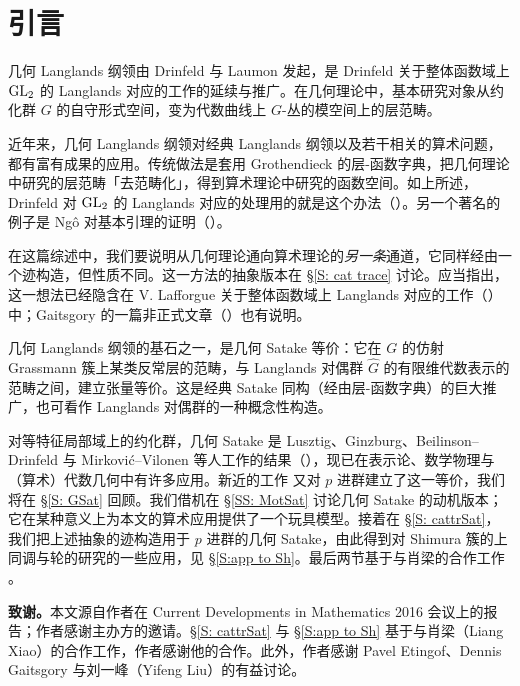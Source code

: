 
\section{引言}

几何 Langlands 纲领由 Drinfeld 与 Laumon 发起，是 Drinfeld 关于整体函数域上 ${\operatorname{GL}}_2$ 的 Langlands 对应的工作的延续与推广。在几何理论中，基本研究对象从约化群 $G$ 的自守形式空间，变为代数曲线上 $G$-丛的模空间上的层范畴。

近年来，几何 Langlands 纲领对经典 Langlands 纲领以及若干相关的算术问题，都有富有成果的应用。传统做法是套用 Grothendieck 的层-函数字典，把几何理论中研究的层范畴「去范畴化」，得到算术理论中研究的函数空间。如上所述，Drinfeld 对 ${\operatorname{GL}}_2$ 的 Langlands 对应的处理用的就是这个办法（\cite{Dr}）。另一个著名的例子是 Ngô 对基本引理的证明（\cite{Ng}）。

在这篇综述中，我们要说明从几何理论通向算术理论的\emph{另一条}通道，它同样经由一个迹构造，但性质不同。这一方法的抽象版本在 \S\ref{S: cat trace} 讨论。应当指出，这一想法已经隐含在 V. Lafforgue 关于整体函数域上 Langlands 对应的工作（\cite{La}）中；Gaitsgory 的一篇非正式文章（\cite{Ga}）也有说明。

几何 Langlands 纲领的基石之一，是几何 Satake 等价：它在 $G$ 的仿射 Grassmann 簇上某类反常层的范畴，与 Langlands 对偶群 $\hat G$ 的有限维代数表示的范畴之间，建立张量等价。这是经典 Satake 同构（经由层-函数字典）的巨大推广，也可看作 Langlands 对偶群的一种概念性构造。

对等特征局部域上的约化群，几何 Satake 是 Lusztig、Ginzburg、Beilinson–Drinfeld 与 Mirković–Vilonen 等人工作的结果（\cite{Lu,Gi1,BD,MV}），现已在表示论、数学物理与（算术）代数几何中有许多应用。新近的工作 \cite{Zh1} 又对 $p$ 进群建立了这一等价，我们将在 \S\ref{S: GSat} 回顾。我们借机在 \S\ref{SS: MotSat} 讨论几何 Satake 的动机版本；它在某种意义上为本文的算术应用提供了一个玩具模型。接着在 \S\ref{S: cattrSat}，我们把上述抽象的迹构造用于 $p$ 进群的几何 Satake，由此得到对 Shimura 簇的上同调与轮的研究的一些应用，见 \S\ref{S:app to Sh}。最后两节基于与肖梁的合作工作 \cite{XZ}。

\medskip

\noindent\textbf{致谢。}本文源自作者在 Current Developments in Mathematics 2016 会议上的报告；作者感谢主办方的邀请。\S\ref{S: cattrSat} 与 \S\ref{S:app to Sh} 基于与肖梁（Liang Xiao）的合作工作，作者感谢他的合作。此外，作者感谢 Pavel Etingof、Dennis Gaitsgory 与刘一峰（Yifeng Liu）的有益讨论。
